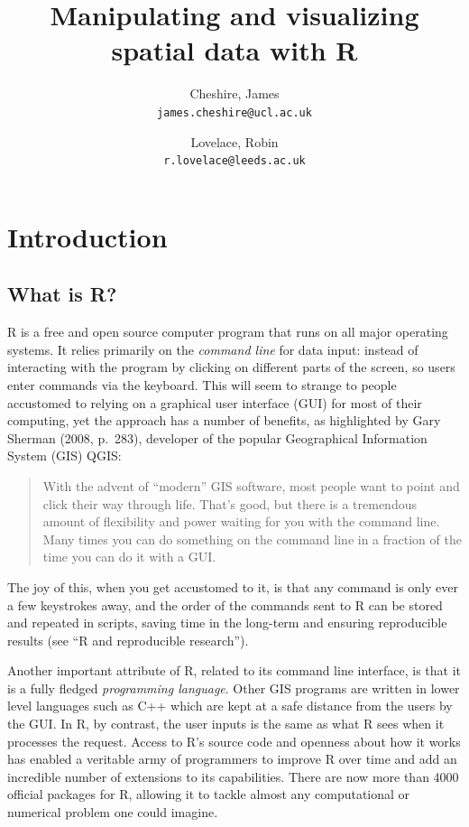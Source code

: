 \documentclass[]{article}
\author{
Cheshire, James\\
\texttt{james.cheshire@ucl.ac.uk}
\and
Lovelace, Robin\\
\texttt{r.lovelace@leeds.ac.uk}
}
\title{Manipulating and visualizing spatial data with R}
\begin{document}
\maketitle

\section{Introduction}

\subsection{What is R?}

R is a free and open source computer program that runs on all major
operating systems. It relies primarily on the \emph{command line} for
data input: instead of interacting with the program by clicking on
different parts of the screen, so users enter commands via the keyboard.
This will seem to strange to people accustomed to relying on a graphical
user interface (GUI) for most of their computing, yet the approach has a
number of benefits, as highlighted by Gary Sherman (2008, p.~283),
developer of the popular Geographical Information System (GIS) QGIS:

\begin{quote}
With the advent of ``modern'' GIS software, most people want to point
and click their way through life. That's good, but there is a tremendous
amount of flexibility and power waiting for you with the command line.
Many times you can do something on the command line in a fraction of the
time you can do it with a GUI.

\end{quote}
The joy of this, when you get accustomed to it, is that any command is
only ever a few keystrokes away, and the order of the commands sent to R
can be stored and repeated in scripts, saving time in the long-term and
ensuring reproducible results (see ``R and reproducible research'').

Another important attribute of R, related to its command line interface,
is that it is a fully fledged \emph{programming language}. Other GIS
programs are written in lower level languages such as C++ which are kept
at a safe distance from the users by the GUI. In R, by contrast, the
user inputs is the same as what R sees when it processes the request.
Access to R's source code and openness about how it works has enabled a
veritable army of programmers to improve R over time and add an
incredible number of extensions to its capabilities. There are now more
than 4000 official packages for R, allowing it to tackle almost any
computational or numerical problem one could imagine.
\end{document}
